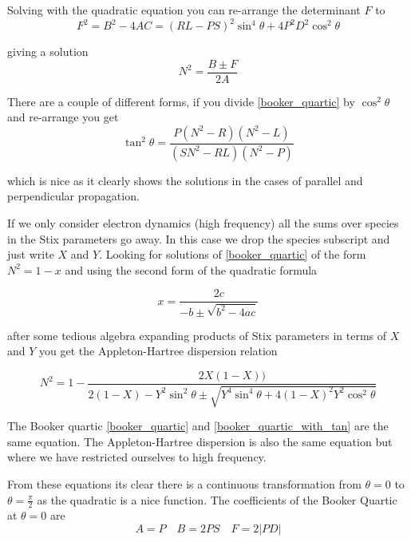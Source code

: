 \documentclass[12pt, twoside]{article}
\begin{document}
	Solving with the quadratic equation you can re-arrange the determinant $F$ to
	\begin{equation}
		F^2 = B^2 - 4AC = \left( RL - PS \right)^2 \sin^4 \theta + 4P^2 D^2 \cos^2 \theta
	\end{equation}

	giving a solution
	\begin{equation}\label{booker_quartic_solution}
		N^2 = \frac{B \pm F}{2A}
	\end{equation}

	There are a couple of different forms, if you divide \eqref{booker_quartic} by $\cos^2 \theta$ and re-arrange you get
	\begin{equation}\label{booker_quartic_with_tan}
		\tan^2 \theta = \frac{P \left(N^2 - R\right) \left(N^2 - L\right)}{\left(SN^2 - RL\right)\left(N^2 - P\right)}
	\end{equation}

	which is nice as it clearly shows the solutions in the cases of parallel and perpendicular propagation.
	
	If we only consider electron dynamics (high frequency) all the sums over species in the Stix parameters go away. In this case we drop the species subscript and just write $X$ and $Y$. Looking for solutions of \eqref{booker_quartic} of the form $N^2 = 1 - x$ and using the second form of the quadratic formula
	
	\begin{equation}
		x = \frac{2c}{-b \pm \sqrt{b^2 - 4ac}}
	\end{equation}

	after some tedious algebra expanding products of Stix parameters in terms of $X$ and $Y$ you get the Appleton-Hartree dispersion relation
	
	\begin{equation}\label{appleton_hartree}
		N^2 = 1 - \frac{2X\left(1-X\right))}{2\left(1-X\right)-Y^2\sin^2\theta \pm \sqrt{Y^4\sin^4 \theta + 4 \left(1-X\right)^2Y^2\cos^2\theta}}
	\end{equation}

	The Booker quartic \eqref{booker_quartic} and \eqref{booker_quartic_with_tan} are the same equation. The Appleton-Hartree dispersion is also the same equation but where we have restricted ourselves to high frequency.
	
	From these equations its clear there is a continuous transformation from $\theta=0$ to $\theta=\frac{\pi}{2}$ as the quadratic is a nice function. The coefficients of the Booker Quartic at $\theta=0$ are
	\begin{equation}
		A = P \quad B = 2PS \quad F = 2\left|PD\right|
	\end{equation}
\end{document}
